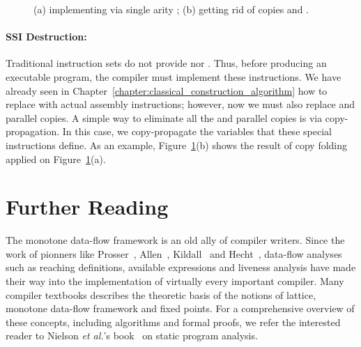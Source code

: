 {\begin{figure}[t!]
\hspace{-1.2cm}\hspace{-0.6cm}
\caption{(a) implementing \sigmafuns via single arity \phifuns; (b) getting rid of copies and \sigmafuns.}
\label{fig:sigImpl}
\end{figure}

\paragraph{SSI Destruction: }
Traditional instruction sets do not provide \phifuns nor \sigmafuns.
Thus, before producing an executable program, the compiler must implement these instructions.
We have already seen in Chapter~\ref{chapter:classical_construction_algorithm} how to replace \phifuns with actual assembly instructions; however, now we must also replace \sigmafuns and parallel copies.
A simple way to eliminate all the \sigmafuns and parallel copies is via copy-propagation.
In this case, we copy-propagate the variables that these special instructions define.
As an example, Figure~\ref{fig:sigImpl}(b) shows the result of copy folding applied on Figure~\ref{fig:sigImpl}(a).

\section{Further Reading}

The monotone data-flow framework is an old ally of compiler writers.
Since the work of pionners like Prosser~\cite{Prosser59}, Allen~\cite{Allen70,Allen76}, Kildall~\cite{Kildall77} and Hecht~\cite{Hecht77}, data-flow analyses such as reaching definitions, available expressions and liveness analysis have made their way into the implementation of virtually every important compiler.
Many compiler textbooks describes the theoretic basis of the notions of lattice, monotone data-flow framework and fixed points.
For a comprehensive overview of these concepts, including algorithms and formal proofs, we refer the interested reader to Nielson {\em et al.}'s book~\cite{Nielson05} on static program analysis.

}
